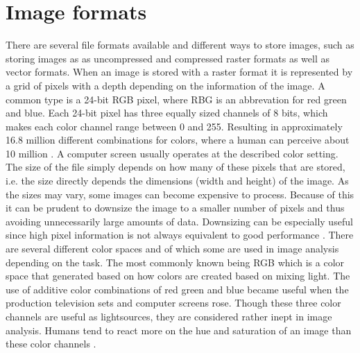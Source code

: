 \section{Image formats}
\label{sec:theory:image_formats}
There are several file formats available and different ways to store images, such as storing images as as uncompressed and compressed raster formats as well as vector formats. When an image is stored with a raster format it is represented by a grid of pixels with a depth depending on the information of the image. A common type is a 24-bit RGB pixel, where RBG is an abbrevation for red green and blue. Each 24-bit pixel has three equally sized channels of 8 bits, which makes each color channel range between 0 and 255. Resulting in approximately 16.8 million different combinations for colors, where a human can perceive about 10 million \cite[p.388]{judd1975color}. A computer screen usually operates at the described color setting. The size of the file simply depends on how many of these pixels that are stored, i.e. the size directly depends the dimensions (width and height) of the image. As the sizes may vary, some images can become expensive to process. Because of this it can be prudent to downsize the image to a smaller number of pixels and thus avoiding unnecessarily large amounts of data. Downsizing can be especially useful since high pixel information is not always equivalent to good performance \cite{torralba200880}.
There are several different color spaces and of which some are used in image analysis depending on the task. The most commonly known being RGB which is a color space that generated based on how colors are created based on mixing light. The use of additive color combinations of red green and blue became useful when the production television sets and computer screens rose. Though these three color channels are useful as lightsources, they are considered rather inept in image analysis. Humans tend to react more on the hue and saturation of an image than these color channels \cite{alzu2015semantic}\cite{cheng2001color}. 


